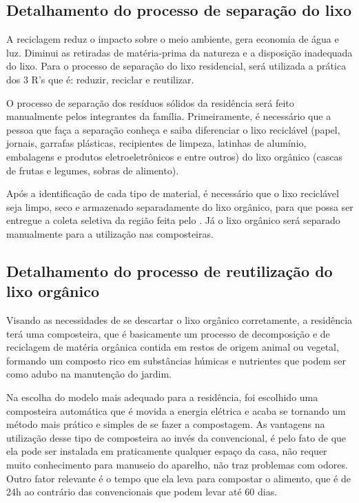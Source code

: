 \subsection{Detalhamento do processo de separação do lixo}

	A reciclagem reduz o impacto sobre o meio ambiente, gera economia de água e luz. Diminui as retiradas de matéria-prima da natureza e a disposição inadequada do lixo. Para o processo de separação do lixo residencial, será utilizada a prática dos 3 R's que é: reduzir, reciclar e reutilizar.

	O processo de separação dos resíduos sólidos da residência será feito manualmente pelos integrantes da família. Primeiramente, é necessário que a pessoa que faça a separação conheça e saiba diferenciar o lixo reciclável (papel, jornais, garrafas plásticas, recipientes de limpeza, latinhas de alumínio, embalagens e produtos eletroeletrônicos e entre outros) do lixo orgânico (cascas de frutas e legumes, sobras de alimento).

	Após a identificação de cada tipo de material, é necessário que o lixo reciclável seja limpo, seco e armazenado separadamente do lixo orgânico, para que possa ser entregue a coleta seletiva da região feita pelo \cite{SLU}. Já o lixo orgânico será separado manualmente para a utilização nas composteiras.

\subsection{Detalhamento do processo de reutilização do lixo orgânico}

	Visando as necessidades de se descartar o lixo orgânico corretamente, a residência terá uma composteira, que é basicamente um processo de decomposição e de reciclagem de matéria orgânica contida em restos de origem animal ou vegetal, formando um composto rico em substâncias húmicas e nutrientes que podem ser como adubo na manutenção do jardim.

	Na escolha do modelo mais adequado para a residência, foi escolhido uma composteira automática que é movida a energia elétrica e acaba se tornando um método mais prático e simples de se fazer a compostagem. As vantagens na utilização desse tipo de composteira ao invés da convencional, é pelo fato de que ela pode ser instalada em praticamente qualquer espaço da casa, não requer muito conhecimento para manuseio do aparelho, não traz problemas com odores. Outro fator relevante é o tempo que ela leva para compostar o alimento, que é de 24h ao contrário das convencionais que podem levar até 60 dias.

